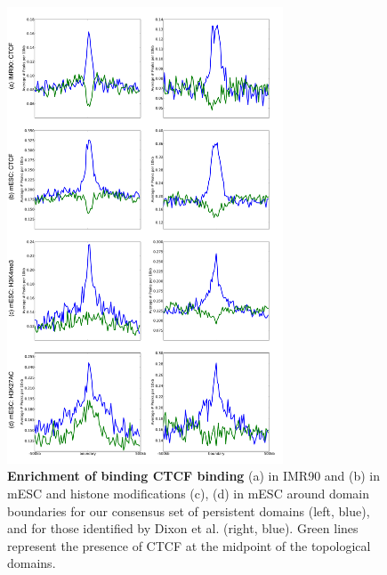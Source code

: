 \documentclass[12pt]{cmuthesis}
\begin{document}
  \begin{figure}[ht]
  \begin{center}
  \includegraphics[width=0.73\textwidth]{figures/fig6_combined_rotated}
  \caption{\textbf{Enrichment of binding CTCF binding} (a) in IMR90 and (b) in mESC and histone modifications (c), (d) in mESC around domain boundaries for our consensus set of persistent domains (left, blue), and for those identified by Dixon et al. (right, blue).  Green lines represent the presence of CTCF at the midpoint of the topological domains.}
  \label{fig:enrichment}
  \end{center}
  \end{figure}
\end{document}
